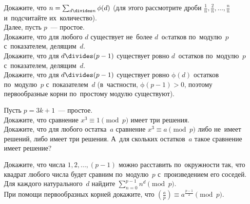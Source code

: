 \begin{problems}

\item
\subproblem
Докажите, что
\(
    n = \sum_{d \divides n} \mathrm{\phi}(d)
\)
(для этого рассмотрите дроби $\frac{1}{n}, \frac{2}{n}, \ldots, \frac{n}{n}$
и~подсчитайте их~количество).
\\
Далее, пусть $p$~— простое.
\\
\subproblem
Докажите, что для любого $d$ существует не~более $d$~оcтатков по~модулю~$p$
с~показателем, делящим~$d$.
\\
\subproblem
Докажите, что для $d \divides (p - 1)$ существует ровно $d$~остатков по~модулю~$p$
с~показателем, делящим~$d$.
\\
\subproblem
Докажите, что для $d \divides (p - 1)$ существует ровно $\mathrm{\phi}(d)$ остатков
по~модулю~$p$ с~показателем~$d$
(в~частности, $\mathrm{\phi}(p - 1) > 0$, поэтому первообразные корни
по~простому модулю существуют).

\item
Пусть $p = 3 k + 1$~— простое.
\\
\subproblem
Докажите, что сравнение $x^3 \equiv 1 \pmod p$ имеет три решения.
\\
\subproblem
Докажите, что для любого остатка~$a$ сравнение $x^3 \equiv a \pmod p$ либо
не~имеет решений, либо имеет три решения.
А~для скольких остатков~$a$ такое сравнение имеет решение?

\item
\subproblem
Докажите, что числа $1, 2, \ldots, (p - 1)$ можно расставить по~окружности так,
что квадрат любого числа будет сравним по~модулю~$p$ с~произведением его
соседей.
\\
\subproblem
Для каждого натурального~$d$ найдите
\(
    \sum_{n=0}^{p-1} n^d \pmod p
\).
\\
\subproblem
При помощи первообразных корней докажите, что
\(
    \genfrac{(}{)}{}{}{a}{p}
\equiv
    a^{\frac{p-1}{2}}
\pmod p
\).


\end{problems}
